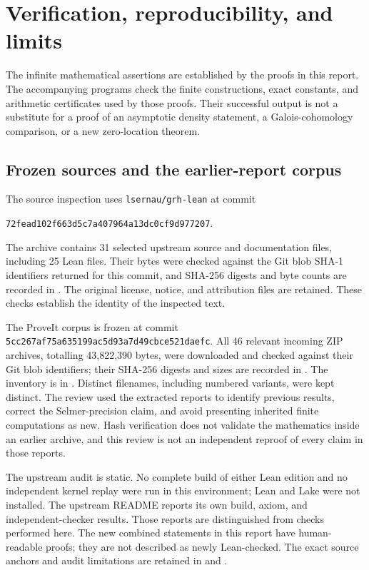 \section{Verification, reproducibility, and limits}
\label{sec:validation}

The infinite mathematical assertions are established by the proofs in
this report. The accompanying programs check the finite constructions,
exact constants, and arithmetic certificates used by those proofs.
Their successful output is not a substitute for a proof of an
asymptotic density statement, a Galois-cohomology comparison, or a new
zero-location theorem.

\subsection{Frozen sources and the earlier-report corpus}

The source inspection uses \texttt{lsernau/grh-lean} at commit
\begin{center}\small
\texttt{72fead102f663d5c7a407964a13dc0cf9d977207}.
\end{center}
The archive contains 31 selected upstream source and documentation
files, including 25 Lean files. Their bytes were checked against the
Git blob SHA-1 identifiers returned for this commit, and SHA-256
digests and byte counts are recorded in
. The original license, notice,
and attribution files are retained. These checks establish the
identity of the inspected text.

The ProveIt corpus is frozen at commit
\texttt{5cc267af75a635199ac5d93a7d49cbce521daefc}.
All 46 relevant incoming ZIP archives, totalling 43,822,390 bytes,
were downloaded and checked against their Git blob identifiers;
their SHA-256 digests and sizes are recorded in
. The inventory is in
. Distinct filenames, including
numbered variants, were kept distinct. The review used the extracted
reports to identify previous results, correct the Selmer-precision
claim, and avoid presenting inherited finite computations as new.
Hash verification does not validate the mathematics inside an
earlier archive, and this review is not an independent reproof of
every claim in those reports.

The upstream audit is static. No complete build of either Lean
edition and no independent kernel replay were run in this
environment; Lean and Lake were not installed. The upstream
README reports its own build, axiom, and independent-checker results.
Those reports are distinguished from checks performed here.
The new combined statements in this report have human-readable
proofs; they are not described as newly Lean-checked.
The exact source anchors and audit limitations are retained in
 and
.

